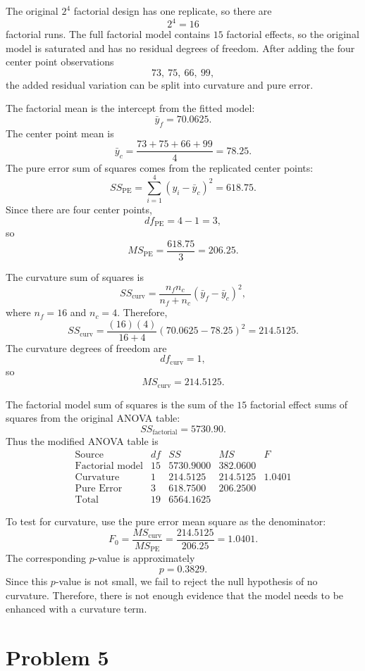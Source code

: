 \documentclass[answers,12pt,addpoints]{exam}
\begin{document}
\begin{solution}
The original $2^4$ factorial design has one replicate, so there are
\[
2^4=16
\]
factorial runs. The full factorial model contains $15$ factorial effects, so the original model is saturated and has no residual degrees of freedom. After adding the four center point observations
\[
73,\ 75,\ 66,\ 99,
\]
the added residual variation can be split into curvature and pure error.

The factorial mean is the intercept from the fitted model:
\[
\bar{y}_f=70.0625.
\]
The center point mean is
\[
\bar{y}_c=\frac{73+75+66+99}{4}=78.25.
\]
The pure error sum of squares comes from the replicated center points:
\[
SS_{\text{PE}}
=
\sum_{i=1}^{4}(y_i-\bar{y}_c)^2
=
618.75.
\]
Since there are four center points,
\[
df_{\text{PE}}=4-1=3,
\]
so
\[
MS_{\text{PE}}=\frac{618.75}{3}=206.25.
\]

The curvature sum of squares is
\[
SS_{\text{curv}}
=
\frac{n_f n_c}{n_f+n_c}(\bar{y}_f-\bar{y}_c)^2,
\]
where $n_f=16$ and $n_c=4$. Therefore,
\[
SS_{\text{curv}}
=
\frac{(16)(4)}{16+4}(70.0625-78.25)^2
=
214.5125.
\]
The curvature degrees of freedom are
\[
df_{\text{curv}}=1,
\]
so
\[
MS_{\text{curv}}=214.5125.
\]

The factorial model sum of squares is the sum of the $15$ factorial effect sums of squares from the original ANOVA table:
\[
SS_{\text{factorial}}=5730.90.
\]
Thus the modified ANOVA table is
\[
\begin{array}{c|c|c|c|c}
\text{Source} & df & SS & MS & F \\
\hline
\text{Factorial model} & 15 & 5730.9000 & 382.0600 & \\
\text{Curvature} & 1 & 214.5125 & 214.5125 & 1.0401 \\
\text{Pure Error} & 3 & 618.7500 & 206.2500 & \\
\hline
\text{Total} & 19 & 6564.1625 & &
\end{array}
\]

To test for curvature, use the pure error mean square as the denominator:
\[
F_0
=
\frac{MS_{\text{curv}}}{MS_{\text{PE}}}
=
\frac{214.5125}{206.25}
=
1.0401.
\]
The corresponding $p$-value is approximately
\[
p=0.3829.
\]
Since this $p$-value is not small, we fail to reject the null hypothesis of no curvature. Therefore, there is not enough evidence that the model needs to be enhanced with a curvature term.
\end{solution}

\section{Problem 5}
\end{document}
